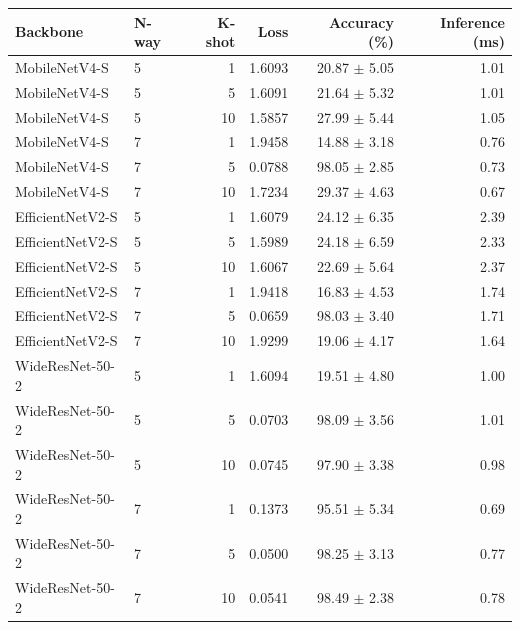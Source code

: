 \begin{tabular}{llrrrr}
Backbone & N-way & K-shot & Loss & Accuracy (\%) & Inference (ms) \\ \hline
MobileNetV4-S & 5 & 1 & 1.6093 & 20.87 $\pm$ 5.05 & 1.01 \\
MobileNetV4-S & 5 & 5 & 1.6091 & 21.64 $\pm$ 5.32 & 1.01 \\
MobileNetV4-S & 5 & 10 & 1.5857 & 27.99 $\pm$ 5.44 & 1.05 \\
MobileNetV4-S & 7 & 1 & 1.9458 & 14.88 $\pm$ 3.18 & 0.76 \\
MobileNetV4-S & 7 & 5 & 0.0788 & 98.05 $\pm$ 2.85 & 0.73 \\
MobileNetV4-S & 7 & 10 & 1.7234 & 29.37 $\pm$ 4.63 & 0.67 \\
EfficientNetV2-S & 5 & 1 & 1.6079 & 24.12 $\pm$ 6.35 & 2.39 \\
EfficientNetV2-S & 5 & 5 & 1.5989 & 24.18 $\pm$ 6.59 & 2.33 \\
EfficientNetV2-S & 5 & 10 & 1.6067 & 22.69 $\pm$ 5.64 & 2.37 \\
EfficientNetV2-S & 7 & 1 & 1.9418 & 16.83 $\pm$ 4.53 & 1.74 \\
EfficientNetV2-S & 7 & 5 & 0.0659 & 98.03 $\pm$ 3.40 & 1.71 \\
EfficientNetV2-S & 7 & 10 & 1.9299 & 19.06 $\pm$ 4.17 & 1.64 \\
WideResNet-50-2 & 5 & 1 & 1.6094 & 19.51 $\pm$ 4.80 & 1.00 \\
WideResNet-50-2 & 5 & 5 & 0.0703 & 98.09 $\pm$ 3.56 & 1.01 \\
WideResNet-50-2 & 5 & 10 & 0.0745 & 97.90 $\pm$ 3.38 & 0.98 \\
WideResNet-50-2 & 7 & 1 & 0.1373 & 95.51 $\pm$ 5.34 & 0.69 \\
WideResNet-50-2 & 7 & 5 & 0.0500 & 98.25 $\pm$ 3.13 & 0.77 \\
WideResNet-50-2 & 7 & 10 & 0.0541 & 98.49 $\pm$ 2.38 & 0.78 \\
\end{tabular}


